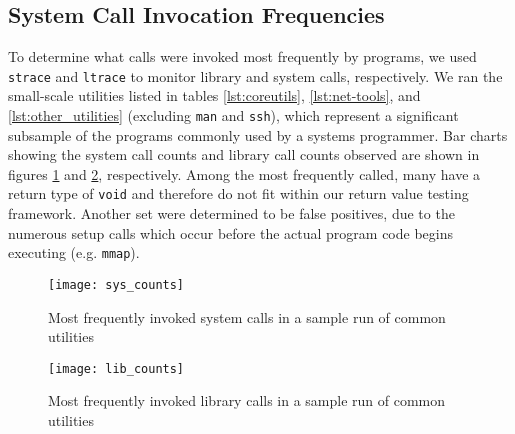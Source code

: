 \subsection{System Call Invocation Frequencies}
To determine what calls were invoked most frequently by programs, we used \texttt{strace} and \texttt{ltrace} to monitor library and system calls, respectively. We ran the small-scale utilities listed in tables \ref{lst:coreutils}, \ref{lst:net-tools}, and \ref{lst:other_utilities} (excluding \texttt{man} and \texttt{ssh}), which represent a significant subsample of the programs commonly used by a systems programmer. Bar charts showing the system call counts and library call counts observed are shown in figures \ref{fig:sys_counts} and \ref{fig:lib_counts}, respectively. Among the most frequently called, many have a return type of \texttt{void} and therefore do not fit within our return value testing framework. Another set were determined to be false positives, due to the numerous setup calls which occur before the actual program code begins executing (e.g. \texttt{mmap}). \\
\begin{figure}
\centering
\texttt{[image: sys\_counts]}
\caption{Most frequently invoked system calls in a sample run of common utilities}
\label{fig:sys_counts}
\end{figure}

\begin{figure}
\centering
\texttt{[image: lib\_counts]}
\caption{Most frequently invoked library calls in a sample run of common utilities}
\label{fig:lib_counts}
\end{figure}
